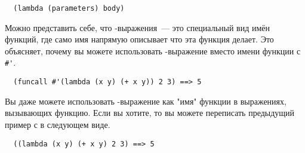 \begin{lstlisting}
  (lambda (parameters) body)
\end{lstlisting}

Можно представить себе, что -выражения~--- это специальный вид имён функций,
где само имя напрямую описывает что эта функция делает.  Это объясняет, почему вы можете
использовать -выражение вместо имени функции с \lstinline!#'!.

\begin{verbatim}
  (funcall #'(lambda (x y) (+ x y)) 2 3) ==> 5
\end{verbatim}

Вы даже можете использовать -выражение как "имя" функции в выражениях,
вызывающих функцию.  Если вы хотите, то вы можете переписать предыдущий пример с
 в следующем виде.

\begin{verbatim}
  ((lambda (x y) (+ x y) 2 3) ==> 5
\end{verbatim}

